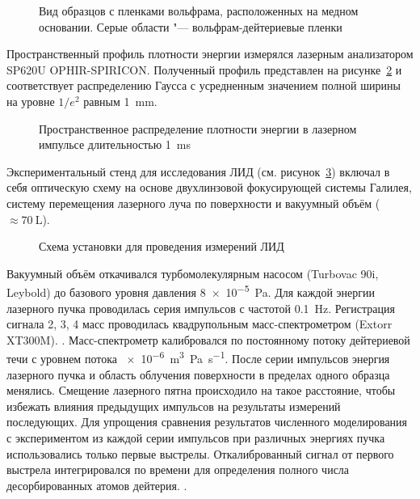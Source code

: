 \begin{figure}[ht]
    \caption{Вид образцов с пленками вольфрама, расположенных на медном основании. Серые области "--- вольфрам-дейтериевые пленки}\label{fig:ch4/LID_target}
\end{figure}

Пространственный профиль плотности энергии измерялся лазерным анализатором SP620U OPHIR-SPIRICON. Полученный профиль представлен на рисунке~\cref{fig:ch4/laser_spatial_distr} и соответствует распределению Гаусса с усредненным значением полной ширины на уровне $1/e^2$ равным \SI{1}{\milli\metre}.

\begin{figure}[ht]
    \caption{Пространственное распределение плотности энергии в лазерном импульсе длительностью \SI{1}{\milli\second}}\label{fig:ch4/laser_spatial_distr}
\end{figure}

 Экспериментальный стенд для исследования ЛИД (см. рисунок~\ref{fig:ch4/LID_scheme}) включал в себя оптическую схему на основе двухлинзовой фокусирующей системы Галилея, систему перемещения лазерного луча по поверхности и вакуумный объём ($\approx\SI{70}{\liter}$). 
\begin{figure}[ht]
    \caption{Схема установки для проведения измерений ЛИД~\cite{Medvedev2024}}\label{fig:ch4/LID_scheme}
\end{figure}
Вакуумный объём откачивался турбомолекулярным насосом (Turbovac 90i, Leybold) до базового уровня давления \SI{8e-5}{\pascal}. Для каждой энергии лазерного пучка проводилась серия импульсов с частотой \SI{0.1}{\hertz}. Регистрация сигнала 2, 3, 4 масс проводилась квадрупольным масс-спектрометром (Extorr XT300M). . Масс-спектрометр калибровался по постоянному потоку дейтериевой течи с уровнем потока \SI{e-6}{\metre\cubed\pascal\per\second}. После серии импульсов энергия лазерного пучка и область облучения поверхности в пределах одного образца менялись. Смещение лазерного пятна происходило на такое расстояние, чтобы избежать влияния предыдущих импульсов на результаты измерений последующих. Для упрощения сравнения результатов численного моделирования с экспериментом из каждой серии импульсов при различных энергиях пучка использовались только первые выстрелы. Откалиброванный сигнал от первого выстрела интегрировался по времени для определения полного числа десорбированных атомов дейтерия. .

